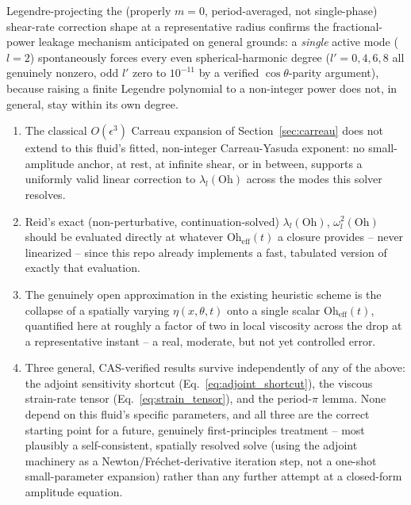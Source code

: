 Legendre-projecting the (properly $m=0$, period-averaged, not single-phase)
shear-rate correction shape at a representative radius confirms the
fractional-power leakage mechanism anticipated on general grounds: a
\emph{single} active mode ($l=2$) spontaneously forces every even
spherical-harmonic degree ($l'=0,4,6,8$ all genuinely nonzero, odd $l'$
zero to $10^{-11}$ by a verified $\cos\theta$-parity argument), because
raising a finite Legendre polynomial to a non-integer power does not, in
general, stay within its own degree.

\begin{keybox}
\begin{enumerate}
  \item The classical $O(\epsilon^3)$ Carreau expansion of
        Section~\ref{sec:carreau} does not extend to this fluid's fitted,
        non-integer Carreau-Yasuda exponent: no small-amplitude anchor,
        at rest, at infinite shear, or in between, supports a uniformly
        valid linear correction to $\lambda_l(\mathrm{Oh})$ across the
        modes this solver resolves.
  \item Reid's exact (non-perturbative, continuation-solved)
        $\lambda_l(\mathrm{Oh})$, $\omega_l^2(\mathrm{Oh})$ should be
        evaluated directly at whatever $\mathrm{Oh}_{\mathrm{eff}}(t)$ a
        closure provides -- never linearized -- since this repo already
        implements a fast, tabulated version of exactly that evaluation.
  \item The genuinely open approximation in the existing heuristic scheme
        is the collapse of a spatially varying $\eta(x,\theta,t)$ onto a
        single scalar $\mathrm{Oh}_{\mathrm{eff}}(t)$, quantified here at
        roughly a factor of two in local viscosity across the drop at a
        representative instant -- a real, moderate, but not yet
        controlled error.
  \item Three general, CAS-verified results survive independently of any
        of the above: the adjoint sensitivity shortcut
        (Eq.~\ref{eq:adjoint_shortcut}), the viscous strain-rate tensor
        (Eq.~\ref{eq:strain_tensor}), and the period-$\pi$ lemma. None
        depend on this fluid's specific parameters, and all three are the
        correct starting point for a future, genuinely first-principles
        treatment -- most plausibly a self-consistent, spatially resolved
        solve (using the adjoint machinery as a Newton/Fr\'echet-derivative
        iteration step, not a one-shot small-parameter expansion) rather
        than any further attempt at a closed-form amplitude equation.
\end{enumerate}
\end{keybox}

